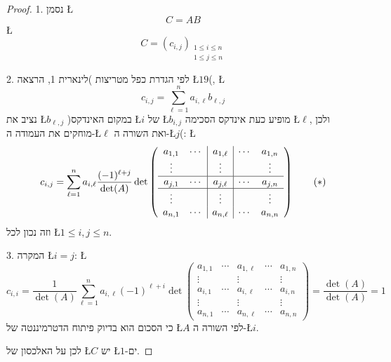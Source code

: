 \documentclass[english,hebrew]{article}
\begin{document}
\begin{proof}
1. נסמן \L{%
\[
C=AB
\]
}%
\L{%
\[
C=\left(c_{i,j}\right)_{\substack{1\leq i\leq n\\
1\leq j\leq n
}
}
\]
}%

2. לפי הגדרת כפל מטריצות )לינארית 1, הרצאה \L{$19$}(, \L{%
\[
c_{i,j}=\sum_{\ell=1}^{n}a_{i,\ell}b_{\ell,j}
\]
}%
נציב את \L{$b_{\ell,j}$} )במקום האינדקס \L{$i$} של \L{$b_{i,j}$}
מופיע כעת אינדקס הסכימה \L{$\ell$}, ולכן מוחקים את העמודה ה-\L{$\ell$}
ואת השורה ה-\L{$j$}(: \L{%
\[
c_{i,j}=\sum_{\ell=1}^{n}a_{i,\ell}\frac{(-1)^{\ell+j}}{\det(A)}\det\left(\begin{array}{cc|c|cc}
a_{1,1} & \cdots & a_{1,\ell} & \cdots & a_{1,n}\\
\vdots &  & \vdots &  & \vdots\\
\hline a_{j,1} & \cdots & a_{j,\ell} & \cdots & a_{j,n}\\
\hline \vdots &  & \vdots &  & \vdots\\
a_{n,1} & \cdots & a_{n,\ell} & \cdots & a_{n,n}
\end{array}\right)\tag{\ensuremath{*}}
\]
}%
וזה נכון לכל \L{$1\leq i,j\leq n$}.

3. המקרה \L{$i=j$}: \L{%
\[
c_{i,i}=\frac{1}{\det(A)}\sum_{\ell=1}^{n}a_{i,\ell}(-1)^{\ell+i}\det\left(\begin{array}{cc|c|cc}
a_{1,1} & \cdots & a_{1,\ell} & \cdots & a_{1,n}\\
\vdots &  & \vdots &  & \vdots\\
\hline a_{i,1} & \cdots & a_{i,\ell} & \cdots & a_{i,n}\\
\hline \vdots &  & \vdots &  & \vdots\\
a_{n,1} & \cdots & a_{n,\ell} & \cdots & a_{n,n}
\end{array}\right)=\frac{\det(A)}{\det(A)}=1
\]
}%
כי הסכום הוא בדיוק פיתוח הדטרמיננטה של \L{$A$} לפי השורה ה-\L{$i$}.

לכן על האלכסון של \L{$C$} יש \L{$1$}-ים.


\end{proof}
\end{document}
